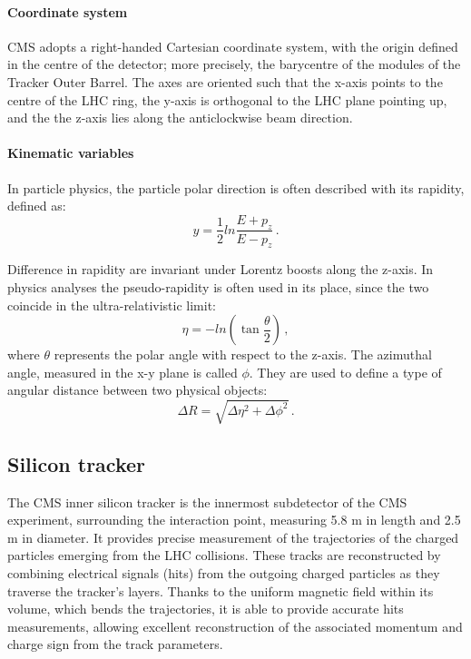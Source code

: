 \paragraph{Coordinate system\\}
CMS adopts a right-handed Cartesian coordinate system, with the origin defined in the centre of the detector; more precisely, the barycentre of the modules of the Tracker Outer Barrel.
The axes are oriented such that the x-axis points to the centre of the LHC ring, the y-axis is orthogonal to the LHC plane pointing up, and the the z-axis lies along the anticlockwise beam direction.

\paragraph{Kinematic variables\\}
In particle physics, the particle polar direction is often described with its rapidity, defined as:
\begin{equation}
  \label{eq:rapidityDefinition}
  y = \frac{1}{2} ln \frac{E + p_z}{E - p_z} \,.
\end{equation}

Difference in rapidity are invariant under Lorentz boosts along the z-axis.
In physics analyses the pseudo-rapidity is often used in its place, since the two coincide in the ultra-relativistic limit:
\begin{equation}
  \label{eq:pseudorapidityDefinition}
  \eta = - ln \left( \tan \frac{\theta}{2} \right) \,,
\end{equation}
where $\theta$ represents the polar angle with respect to the z-axis. The azimuthal angle, measured in the x-y plane is called $\phi$.
They are used to define a type of angular distance between two physical objects:
\begin{equation}
  \label{eq:deltaRDefinition}
  \Delta R = \sqrt{ \Delta \eta^2 + \Delta \phi^2 } \,.
\end{equation}

\subsection{Silicon tracker}
The CMS inner silicon tracker is the innermost subdetector of the CMS experiment, surrounding the interaction point, measuring 5.8 m in length and 2.5 m in diameter.
It provides precise measurement of the trajectories of the charged particles emerging from the LHC collisions.
These tracks are reconstructed by combining electrical signals (hits) from the outgoing charged particles as they traverse the tracker's layers.
Thanks to the uniform magnetic field within its volume, which bends the trajectories, it is able to provide accurate hits measurements,
allowing excellent reconstruction of the associated momentum and charge sign from the track parameters.

